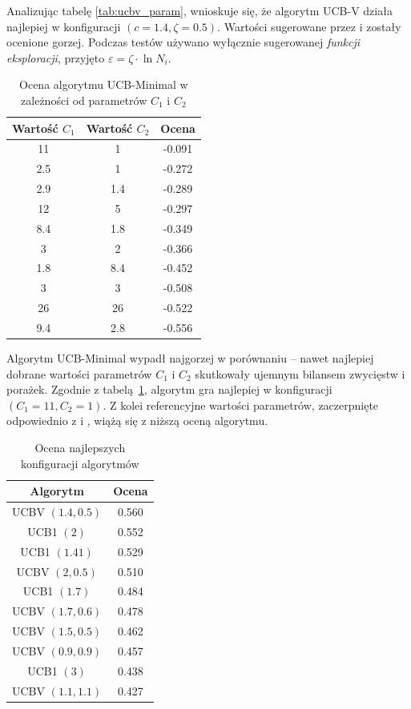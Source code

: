 \documentclass[a4paper,12pt]{article}
\begin{document}
Analizując tabelę \ref{tab:ucbv_param}, wnioskuje się, że algorytm UCB-V działa najlepiej w konfiguracji $(c=1.4, \zeta=0.5)$. Wartości sugerowane przez \cite{tron} i \cite{ucbv} zostały ocenione gorzej. Podczas testów używano wyłącznie sugerowanej \textit{funkcji eksploracji}, przyjęto $\varepsilon=\zeta \cdot \ln N_i$.\\

\begin{table}[!h]
	\centering
	\begin{tabular}{|c|c|c|} \hline
		Wartość $C_1$ & Wartość $C_2$ & Ocena \\ \hline
		11 & 1 & 	-0.091 \\ \hline
		\rowcolor{teal} 2.5 & 1 & 	-0.272 \\ \hline
		2.9 & 1.4 & 	-0.289 \\ \hline
		12 & 5 & 	-0.297 \\ \hline
		\rowcolor{teal} 8.4 & 1.8 & 	-0.349 \\ \hline
		3 & 2 & 	-0.366 \\ \hline
		1.8 & 8.4 & 	-0.452 \\ \hline
		3 & 3 & 	-0.508 \\ \hline
		26 & 26 & 	-0.522 \\ \hline
		9.4 & 2.8 & 	-0.556 \\ \hline
	\end{tabular}
	\caption{Ocena algorytmu UCB-Minimal w zależności od parametrów $C_1$ i $C_2$}
	\label{tab:ucbm_param}
\end{table}

Algorytm UCB-Minimal wypadł najgorzej w porównaniu -- nawet najlepiej dobrane wartości parametrów $C_1$ i $C_2$ skutkowały ujemnym bilansem zwycięstw i porażek. Zgodnie z tabelą~\ref{tab:ucbm_param}, algorytm gra najlepiej w konfiguracji $(C_1 = 11, C_2 = 1)$. Z kolei referencyjne wartości parametrów, zaczerpnięte odpowiednio z \cite{ucbminimal} i \cite{tron}, wiążą się z niższą oceną algorytmu.

\clearpage

\begin{table}[!h]
	\centering
	\begin{tabular}{|c|c|} \hline
		Algorytm & Ocena \\ \hline
		UCBV $(1.4, 0.5)$ &	0.560 \\ \hline
		UCB1 $(2)$ &	0.552 \\ \hline
		UCB1 $(1.41)$ &	0.529 \\ \hline
		UCBV $(2, 0.5)$ &	0.510 \\ \hline
		UCB1 $(1.7)$ &	0.484 \\ \hline
		UCBV $(1.7, 0.6)$ &	0.478 \\ \hline
		UCBV $(1.5, 0.5)$ &	0.462 \\ \hline
		UCBV $(0.9, 0.9)$ &	0.457 \\ \hline
		UCB1 $(3)$ &	0.438 \\ \hline
		UCBV $(1.1, 1.1)$ &	0.427 \\ \hline
	\end{tabular}
	\caption{Ocena najlepszych konfiguracji algorytmów}
	\label{tab:all_params}
\end{table}
\end{document}
